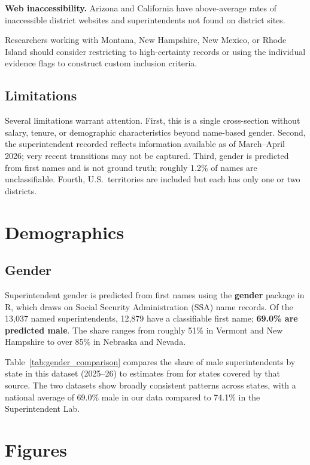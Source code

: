 \documentclass[12pt]{article}
\begin{document}
\textbf{Web inaccessibility.} Arizona and California have above-average rates of inaccessible district websites and superintendents not found on district sites.

Researchers working with Montana, New Hampshire, New Mexico, or Rhode Island should consider restricting to high-certainty records or using the individual evidence flags to construct custom inclusion criteria.

\subsection{Limitations}

Several limitations warrant attention. First, this is a single cross-section without salary, tenure, or demographic characteristics beyond name-based gender. Second, the superintendent recorded reflects information available as of March--April 2026; very recent transitions may not be captured. Third, gender is predicted from first names and is not ground truth; roughly 1.2\% of names are unclassifiable. Fourth, U.S.\ territories are included but each has only one or two districts.

\section{Demographics}

\subsection{Gender}

Superintendent gender is predicted from first names using the \textbf{gender} package in R, which draws on Social Security Administration (SSA) name records. Of the 13,037 named superintendents, 12,879 have a classifiable first name; \textbf{69.0\% are predicted male}. The share ranges from roughly 51\% in Vermont and New Hampshire to over 85\% in Nebraska and Nevada.

Table~\ref{tab:gender_comparison} compares the share of male superintendents by state in this dataset (2025--26) to estimates from \citet{superintendentlab} for states covered by that source. The two datasets show broadly consistent patterns across states, with a national average of 69.0\% male in our data compared to 74.1\% in the Superintendent Lab.

\section*{Figures}
\end{document}
